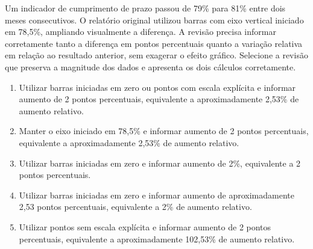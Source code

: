 \documentclass[12pt,a4paper]{article}
\begin{document}
\TextoBase
Um indicador de cumprimento de prazo passou de 79\% para 81\% entre dois meses consecutivos. O relatório original utilizou barras com eixo vertical iniciado em 78,5\%, ampliando visualmente a diferença. A revisão precisa informar corretamente tanto a diferença em pontos percentuais quanto a variação relativa em relação ao resultado anterior, sem exagerar o efeito gráfico.
\FonteDidatica
\Comando Selecione a revisão que preserva a magnitude dos dados e apresenta os dois cálculos corretamente.
\begin{enumerate}[label=\Alph*)]
\item Utilizar barras iniciadas em zero ou pontos com escala explícita e informar aumento de 2 pontos percentuais, equivalente a aproximadamente 2,53\% de aumento relativo.
\item Manter o eixo iniciado em 78,5\% e informar aumento de 2 pontos percentuais, equivalente a aproximadamente 2,53\% de aumento relativo.
\item Utilizar barras iniciadas em zero e informar aumento de 2\%, equivalente a 2 pontos percentuais.
\item Utilizar barras iniciadas em zero e informar aumento de aproximadamente 2,53 pontos percentuais, equivalente a 2\% de aumento relativo.
\item Utilizar pontos sem escala explícita e informar aumento de 2 pontos percentuais, equivalente a aproximadamente 102,53\% de aumento relativo.
\end{enumerate}
\end{document}
